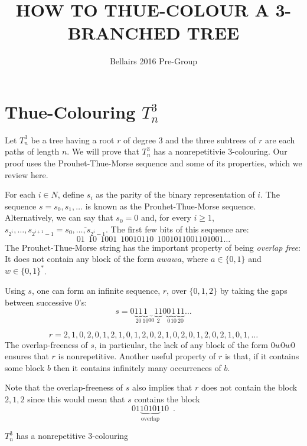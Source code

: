 \documentclass{patmorin}
\title{\MakeUppercase{How to Thue-Colour a 3-Branched Tree}}
\author{Bellairs 2016 Pre-Group}
\begin{document}
\maketitle 

\section{Thue-Colouring $T^3_n$}

Let $T^3_n$ be a tree having a root $r$ of degree 3 and the three subtrees of $r$ are each paths of length $n$.  We will prove that $T^3_n$ has a nonrepetitivie 3-colouring.  Our proof uses the Prouhet-Thue-Morse sequence and some of its properties, which we review here.

For each $i\in N$, define $s_i$ as the parity of the binary representation
of $i$.  The sequence $s=s_0,s_1,\ldots$ is known as the Prouhet-Thue-Morse
sequence.  Alternatively, we can say that $s_0=0$ and, for every $i\ge 1$,
$s_{2^{i}},\ldots,s_{2^{i+1}-1}=\overline{s_0,\ldots,s_{2^{i}-1}}$.
The first few bits of this sequence are:
\[
   01\:\: 10\:\: 1001\:\: 10010110\:\: 1001011001101001\ldots
\]
The Prouhet-Thue-Morse string has the important property of being
\emph{overlap free}: It does not contain any block of the form $awawa$,
where $a\in\{0,1\}$ and $w\in\{0,1\}^*$.

Using $s$, one can form an infinite sequence, $r$, over $\{0,1,2\}$
by taking the gaps between successive 0's:
\[
   s = 0\underbrace{11}_20\underbrace{1}_10\underbrace{}_00\underbrace{11}_{2}0\underbrace{0}_0\underbrace{1}_10\underbrace{11}_20\ldots
\]

\[
    r=2,1,0,2,0,1,2,1,0,1,2,0,2,1,0,2,0,1,2,0,2,1,0,1,\ldots
\]
The overlap-freeness of $s$, in particular, the lack of any block of the
form $0w0w0$ ensures that $r$ is nonrepetitive. Another useful property
of $r$ is that, if it contains some block $b$ then it contains infinitely
many occurrences of $b$.  

Note that the overlap-freeness of $s$ also implies that $r$ does not
contain the block $2,1,2$ since this would mean that $s$ contains
the block
\[ 
   01\underbrace{10101}_\text{overlap}10 \enspace .
\]

\begin{thm}
  $T^3_n$ has a nonrepetitive 3-colouring
\end{thm}
\end{document}
